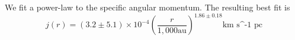 We fit a power-law to the specific angular momentum. 
The resulting best fit is 
\begin{equation}
j(r) = (3.2\pm5.1)\times 10^{-4}\left( \frac{r}{1,000 \textrm{au}}\right)^{1.86\pm0.18} \textrm{km s^{-1} pc}
\end{equation}
  
  